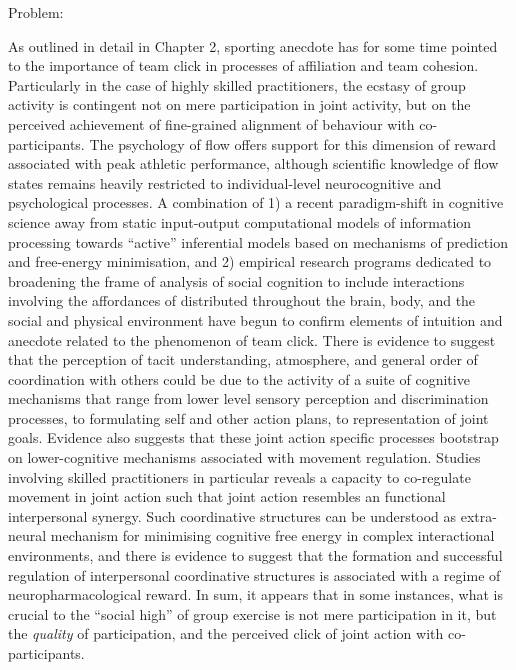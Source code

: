Problem:

As outlined in detail in Chapter 2, sporting anecdote has for some time pointed to the importance of team click in processes of affiliation and team cohesion.  Particularly in the case of highly skilled practitioners, the ecstasy of group activity is contingent not on mere participation in joint activity, but on the perceived achievement of fine-grained alignment of behaviour with co-participants.  The psychology of flow offers support for this dimension of reward associated with peak athletic performance, although scientific knowledge of flow states remains heavily restricted to individual-level neurocognitive and psychological processes.  A combination of 1) a recent paradigm-shift in cognitive science away from static input-output computational models of information processing towards ``active'' inferential models based on mechanisms of prediction and free-energy minimisation, and 2) empirical research programs dedicated to broadening the frame of analysis of social cognition to include interactions involving the affordances of distributed throughout the brain, body, and the social and physical environment have begun to confirm elements of intuition and anecdote related to the phenomenon of team click.  There is evidence to suggest that the perception of tacit understanding, atmosphere, and general order of coordination with others could be due to the activity of a suite of cognitive mechanisms that range from lower level sensory perception and discrimination processes, to formulating self and other action plans, to representation of joint goals.  Evidence also suggests that these joint action specific processes bootstrap on lower-cognitive mechanisms associated with movement regulation.
Studies involving skilled practitioners in particular reveals a capacity to co-regulate movement in joint action such that joint action resembles an functional interpersonal synergy.  Such coordinative structures can be understood as extra-neural mechanism for minimising cognitive free energy in complex interactional environments, and there is evidence to suggest that the formation and successful regulation of interpersonal coordinative structures is associated with a regime of neuropharmacological reward.  In sum, it appears that in some instances, what is crucial to the ``social high'' of group exercise is not mere participation in it, but the \textit{quality} of participation, and the perceived click of joint action with co-participants.

